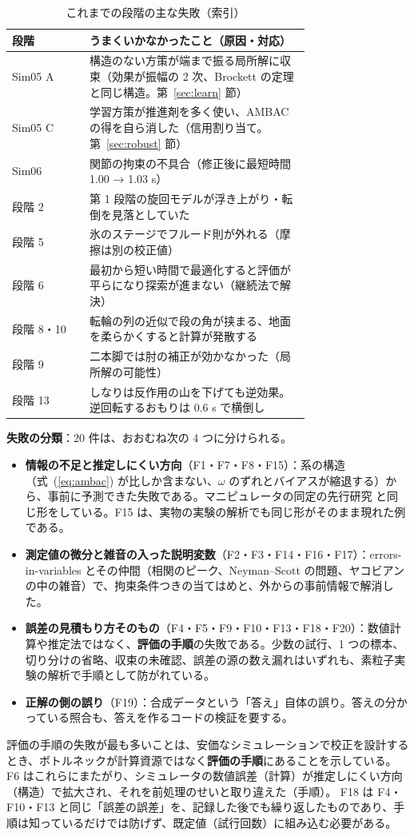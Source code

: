 \documentclass[paper=a4paper,fontsize=10pt,twocolumn,column_gap=2zw,line_length=24zw,number_of_lines=46,head_space=20mm]{jlreq}
\begin{document}
\begin{table}[t]\centering\footnotesize
\caption{これまでの段階の主な失敗（索引）}\label{tab:failidx}
\setlength{\tabcolsep}{2pt}
\begin{tabular}{lp{0.74\linewidth}}\toprule
段階 & うまくいかなかったこと（原因・対応） \\\midrule
Sim05 A & 構造のない方策が端まで振る局所解に収束（効果が振幅の 2 次、Brockett の定理と同じ構造。第~\ref{sec:learn} 節） \\
Sim05 C & 学習方策が推進剤を多く使い、AMBAC の得を自ら消した（信用割り当て。第~\ref{sec:robust} 節） \\
Sim06 & 関節の拘束の不具合（修正後に最短時間 1.00 → 1.03 s） \\
段階 2 & 第 1 段階の旋回モデルが浮き上がり・転倒を見落としていた \\
段階 5 & 氷のステージでフルード則が外れる（摩擦は別の校正値） \\
段階 6 & 最初から短い時間で最適化すると評価が平らになり探索が進まない（継続法で解決） \\
段階 8・10 & 転輪の列の近似で段の角が挟まる、地面を柔らかくすると計算が発散する \\
段階 9 & 二本脚では肘の補正が効かなかった（局所解の可能性） \\
段階 13 & しなりは反作用の山を下げても逆効果。逆回転するおもりは 0.6 s で横倒し \\\bottomrule
\end{tabular}
\end{table}

\textbf{失敗の分類}：20 件は、おおむね次の 4 つに分けられる。
\begin{itemize}\setlength{\itemsep}{0pt}
\item \textbf{情報の不足と推定しにくい方向}（F1・F7・F8・F15）：系の構造（式~(\ref{eq:ambac}) が比しか含まない、$\omega$ のずれとバイアスが縮退する）から、事前に予測できた失敗である。マニピュレータの同定の先行研究 \cite{gautier1990} と同じ形をしている。F15 は、実物の実験の解析でも同じ形がそのまま現れた例である。
\item \textbf{測定値の微分と雑音の入った説明変数}（F2・F3・F14・F16・F17）：errors-in-variables とその仲間（相関のピーク、Neyman--Scott の問題、ヤコビアンの中の雑音）で、拘束条件つきの当てはめと、外からの事前情報で解消した。
\item \textbf{誤差の見積もり方そのもの}（F4・F5・F9・F10・F13・F18・F20）：数値計算や推定法ではなく、\textbf{評価の手順}の失敗である。少数の試行、1 つの標本、切り分けの省略、収束の未確認、誤差の源の数え漏れはいずれも、素粒子実験の解析で手順として防がれている。
\item \textbf{正解の側の誤り}（F19）：合成データという「答え」自体の誤り。答えの分かっている照合も、答えを作るコードの検証を要する。
\end{itemize}
評価の手順の失敗が最も多いことは、安価なシミュレーションで校正を設計するとき、ボトルネックが計算資源ではなく\textbf{評価の手順}にあることを示している。
F6 はこれらにまたがり、シミュレータの数値誤差（計算）が推定しにくい方向（構造）で拡大され、それを前処理のせいと取り違えた（手順）。
F18 は F4・F10・F13 と同じ「誤差の誤差」を、記録した後でも繰り返したものであり、手順は知っているだけでは防げず、既定値（試行回数）に組み込む必要がある。
\end{document}
